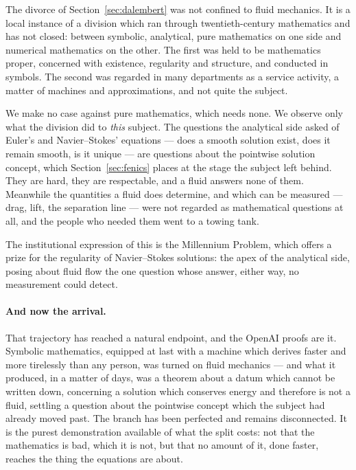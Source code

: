 \documentclass[11pt]{article}
\begin{document}
The divorce of Section~\ref{sec:dalembert} was not confined to fluid mechanics. It is a local
instance of a division which ran through twentieth-century mathematics and has not closed: between
symbolic, analytical, pure mathematics on one side and numerical mathematics on the other. The first
was held to be mathematics proper, concerned with existence, regularity and structure, and conducted
in symbols. The second was regarded in many departments as a service activity, a matter of machines
and approximations, and not quite the subject.

We make no case against pure mathematics, which needs none. We observe only what the division did to
\emph{this} subject. The questions the analytical side asked of Euler's and Navier--Stokes' equations
--- does a smooth solution exist, does it remain smooth, is it unique --- are questions about the
pointwise solution concept, which Section~\ref{sec:fenics} places at the stage the subject left
behind. They are hard, they are respectable, and a fluid answers none of them. Meanwhile the
quantities a fluid does determine, and which can be measured --- drag, lift, the separation line ---
were not regarded as mathematical questions at all, and the people who needed them went to a towing
tank.

The institutional expression of this is the Millennium Problem, which offers a prize for the
regularity of Navier--Stokes solutions: the apex of the analytical side, posing about fluid flow the
one question whose answer, either way, no measurement could detect.

\paragraph{And now the arrival.} That trajectory has reached a natural endpoint, and the OpenAI
proofs are it. Symbolic mathematics, equipped at last with a machine which derives faster and more
tirelessly than any person, was turned on fluid mechanics --- and what it produced, in a matter of
days, was a theorem about a datum which cannot be written down, concerning a solution which conserves
energy and therefore is not a fluid, settling a question about the pointwise concept which the
subject had already moved past. The branch has been perfected and remains disconnected. It is the
purest demonstration available of what the split costs: not that the mathematics is bad, which it is
not, but that no amount of it, done faster, reaches the thing the equations are about.
\end{document}
